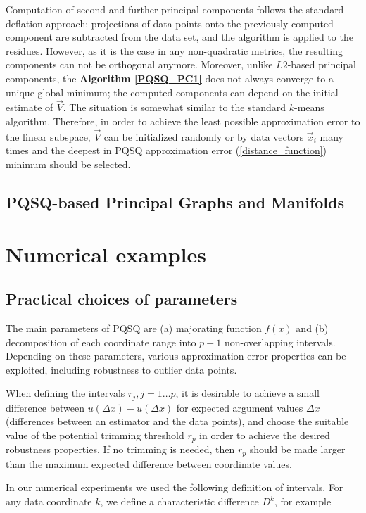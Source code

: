 \documentclass[preprint,12pt]{elsarticle}
\begin{document}
Computation of second and further principal components follows the standard deflation approach: projections of data points onto the previously computed component are subtracted from the data set, and the algorithm is applied to the residues. However, as it is the case in any non-quadratic metrics, the resulting components can not be orthogonal anymore.
Moreover, unlike $L2$-based principal components, the \textbf{Algorithm \ref{PQSQ_PC1}} does not always converge to a unique global minimum; the computed components can depend on the initial estimate of $\vec{V}$. The situation is somewhat similar to the standard $k$-means algorithm. Therefore, in order to achieve the least possible approximation error to the linear subspace, $\vec{V}$ can be initialized randomly or by data vectors $\vec{x}_i$ many times and the deepest in PQSQ approximation error (\ref{distance_function}) minimum should be selected.


\subsection{PQSQ-based Principal Graphs and Manifolds}



\section{Numerical examples}

\subsection{Practical choices of parameters}

The main parameters of PQSQ are (a) majorating function $f(x)$ and (b) decomposition of each coordinate range into $p+1$ non-overlapping intervals.
Depending on these parameters, various approximation error properties can be exploited, including robustness to outlier data points.

When defining the intervals $r_j, j=1\dots p$, it is desirable to achieve a small difference between $u(\Delta x)-u(\Delta x)$ for expected argument values $\Delta x$ (differences between an estimator and the data points), and choose the suitable value of the potential trimming threshold $r_p$ in order to achieve the desired robustness properties. If no trimming is needed, then $r_p$ should be made larger than the maximum expected difference between coordinate values.

In our numerical experiments we used the following definition of intervals. For any data coordinate $k$, we define a characteristic difference $D^k$, for example
\end{document}
